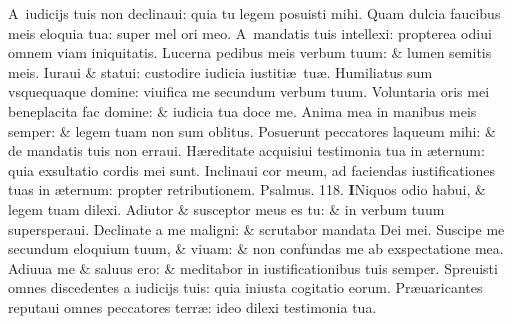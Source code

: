 \documentclass[a5paper,10pt]{book}
\def\ae{æ}
\begin{document}
\begin{multicols*}{2}
\newline \color{red} A\color{black}\ iudicijs tuis non declinaui: quia tu legem posuisti mihi.
\newline \color{red} Q\color{black}uam dulcia faucibus meis eloquia tua: super mel ori meo.
\newline \color{red} A\color{black}\ mandatis tuis intellexi: propterea odiui omnem viam iniquitatis.
\newline \color{red} L\color{black}ucerna pedibus meis verbum tuum: \& lumen semitis meis.
\newline \color{red} I\color{black}uraui \& statui: custodire iudicia iustiti\ae \ tu\ae .
\newline \color{red} H\color{black}umiliatus sum vsquequaque domine: viuifica me secundum verbum tuum.
\newline \color{red} V\color{black}oluntaria oris mei beneplacita fac domine: \& iudicia tua doce me.
\newline \color{red} A\color{black}nima mea in manibus meis semper: \& legem tuam non sum oblitus.
\newline \color{red} P\color{black}osuerunt peccatores laqueum mihi: \& de mandatis tuis non erraui.
\newline \color{red} H\color{black}\ae reditate acquisiui testimonia tua in \ae ternum: quia exsultatio cordis mei sunt.
\newline \color{red} I\color{black}nclinaui cor meum, ad faciendas iustificationes tuas in \ae ternum: propter retributionem. \quad \color{red} Psalmus. 118. \color{black}
\lettrine[lines=2]{\bfseries \color{red} I}{}Niquos odio habui, \& legem tuam dilexi.
\newline \color{red} A\color{black}diutor \& susceptor meus es tu: \& in verbum tuum supersperaui.
\newline \color{red} D\color{black}eclinate a me maligni: \& scrutabor mandata Dei mei.
\newline \color{red} S\color{black}uscipe me secundum eloquium  tuum, \& viuam: \& non confundas me ab exspectatione mea.
\newline \color{red} A\color{black}diuua me \& saluus ero: \& meditabor in iustificationibus tuis semper.
\newline \color{red} S\color{black}preuisti omnes discedentes a iudicijs tuis: quia iniusta cogitatio eorum.
\newline \color{red} P\color{black}r\ae uaricantes reputaui omnes peccatores terr\ae : ideo dilexi testimonia tua.

\end{multicols*}
\end{document}
